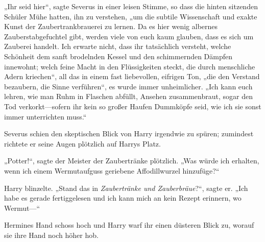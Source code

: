 „Ihr seid hier“, sagte Severus in einer leisen Stimme, so dass die hinten sitzenden Schüler Mühe hatten, ihn zu verstehen, „um die subtile Wissenschaft und exakte Kunst der Zaubertrankbrauerei zu lernen. Da es hier wenig albernes Zauberstabgefuchtel gibt, werden viele von euch kaum glauben, dass es sich um Zauberei handelt. Ich erwarte nicht, dass ihr tatsächlich versteht, welche Schönheit dem sanft brodelnden Kessel und den schimmernden Dämpfen innewohnt; welch feine Macht in den Flüssigkeiten steckt, die durch menschliche Adern kriechen“, all das in einem fast liebevollen, eifrigen Ton, „die den Verstand bezaubern, die Sinne verführen“, es wurde immer unheimlicher. „Ich kann euch lehren, wie man Ruhm in Flaschen abfüllt, Ansehen zusammenbraut, sogar den Tod verkorkt—sofern ihr kein so großer Haufen Dummköpfe seid, wie ich sie sonst immer unterrichten muss.“

Severus schien den skeptischen Blick von Harry irgendwie zu spüren; zumindest richtete er seine Augen plötzlich auf Harrys Platz.

„Potter!“, sagte der Meister der Zaubertränke plötzlich. „Was würde ich erhalten, wenn ich einem Wermutaufguss geriebene Affodillwurzel hinzufüge?“

Harry blinzelte. „Stand das in \emph{Zaubertränke und Zauberbräue}?“, sagte er. „Ich habe es gerade fertiggelesen und ich kann mich an kein Rezept erinnern, wo Wermut—“

Hermines Hand schoss hoch und Harry warf ihr einen düsteren Blick zu, worauf sie ihre Hand noch höher hob.

